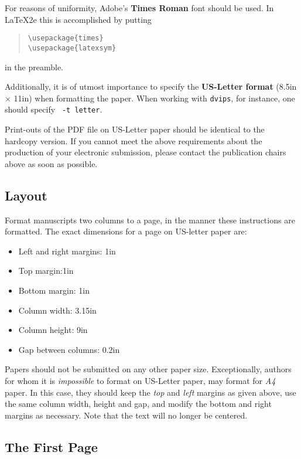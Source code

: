 \documentclass[11pt,letterpaper]{article}
\begin{document}
For reasons of uniformity, Adobe's {\bf Times Roman} font should be
used. In \LaTeX2e{} this is accomplished by putting

\begin{quote}
\begin{verbatim}
\usepackage{times}
\usepackage{latexsym}
\end{verbatim}
\end{quote}
in the preamble.

Additionally, it is of utmost importance to specify the {\bf
  US-Letter format} (8.5in $\times$ 11in) when formatting the paper.
When working with {\tt dvips}, for instance, one should specify {\tt
  -t letter}.

Print-outs of the PDF file on US-Letter paper should be identical to the
hardcopy version.  If you cannot meet the above requirements about the
production of your electronic submission, please contact the
publication chairs above  as soon as possible.


\subsection{Layout}
\label{ssec:layout}

Format manuscripts two columns to a page, in the manner these
instructions are formatted. The exact dimensions for a page on US-letter
paper are:

\begin{itemize}
\item Left and right margins: 1in
\item Top margin:1in
\item Bottom margin: 1in
\item Column width: 3.15in
\item Column height: 9in
\item Gap between columns: 0.2in
\end{itemize}

\noindent Papers should not be submitted on any other paper size. Exceptionally,
authors for whom it is \emph{impossible} to format on US-Letter paper,
may format for \emph{A4} paper. In this case, they should keep the \emph{top}
and \emph{left} margins as given above, use the same column width,
height and gap, and modify the bottom and right margins as necessary.
Note that the text will no longer be centered.

\subsection{The First Page}
\label{ssec:first}
\end{document}
